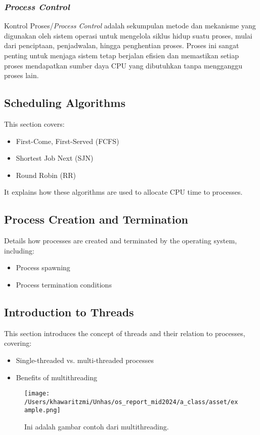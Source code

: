 \documentclass[12pt]{article}
\begin{document}
\subsubsection{\textit{Process Control}}
Kontrol Proses/\textit{Process Control} adalah sekumpulan metode dan mekanisme yang digunakan oleh sistem operasi untuk mengelola siklus hidup suatu proses, 
mulai dari penciptaan, penjadwalan, hingga penghentian proses. Proses ini sangat penting untuk menjaga sistem tetap berjalan efisien dan memastikan setiap 
proses mendapatkan sumber daya CPU yang dibutuhkan tanpa mengganggu proses lain.

\subsection{Scheduling Algorithms}
This section covers:
\begin{itemize}
    \item First-Come, First-Served (FCFS)
    \item Shortest Job Next (SJN)
    \item Round Robin (RR)
\end{itemize}
It explains how these algorithms are used to allocate CPU time to processes.

\subsection{Process Creation and Termination}
Details how processes are created and terminated by the operating system, including:
\begin{itemize}
    \item Process spawning
    \item Process termination conditions
\end{itemize}

\subsection{Introduction to Threads}
This section introduces the concept of threads and their relation to processes, covering:
\begin{itemize}
    \item Single-threaded vs. multi-threaded processes
    \item Benefits of multithreading
\end{itemize}

\begin{figure}[h]
    \centering
    \texttt{[image: /Users/khawaritzmi/Unhas/os\_report\_mid2024/a\_class/asset/example.png]}  %
    \caption{Ini adalah gambar contoh dari multithreading.}
    \label{fig:contoh_gambar}
\end{figure}
\end{document}
